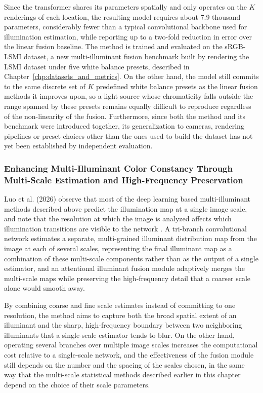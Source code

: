 Since the transformer shares its parameters spatially and only operates on the $K$ renderings of each location, the resulting model requires about 7.9 thousand parameters, considerably fewer than a typical convolutional backbone used for illumination estimation, while reporting up to a two-fold reduction in error over the linear fusion baseline. The method is trained and evaluated on the sRGB-LSMI dataset, a new multi-illuminant fusion benchmark built by rendering the LSMI dataset under five white balance presets, described in Chapter~\ref{chp:datasets_and_metrics}. On the other hand, the model still commits to the same discrete set of $K$ predefined white balance presets as the linear fusion methods it improves upon, so a light source whose chromaticity falls outside the range spanned by these presets remains equally difficult to reproduce regardless of the non-linearity of the fusion. Furthermore, since both the method and its benchmark were introduced together, its generalization to cameras, rendering pipelines or preset choices other than the ones used to build the dataset has not yet been established by independent evaluation.

\subsubsection{Enhancing Multi-Illuminant Color Constancy Through Multi-Scale Estimation and High-Frequency Preservation}

Luo et al. (2026) observe that most of the deep learning based multi-illuminant methods described above predict the illumination map at a single image scale, and note that the resolution at which the image is analyzed affects which illumination transitions are visible to the network \cite{luoMultiIlluminantMultiScaleHighFrequency}. A tri-branch convolutional network estimates a separate, multi-grained illuminant distribution map from the image at each of several scales, representing the final illuminant map as a combination of these multi-scale components rather than as the output of a single estimator, and an attentional illuminant fusion module adaptively merges the multi-scale maps while preserving the high-frequency detail that a coarser scale alone would smooth away.

By combining coarse and fine scale estimates instead of committing to one resolution, the method aims to capture both the broad spatial extent of an illuminant and the sharp, high-frequency boundary between two neighboring illuminants that a single-scale estimator tends to blur. On the other hand, operating several branches over multiple image scales increases the computational cost relative to a single-scale network, and the effectiveness of the fusion module still depends on the number and the spacing of the scales chosen, in the same way that the multi-scale statistical methods described earlier in this chapter depend on the choice of their scale parameters.